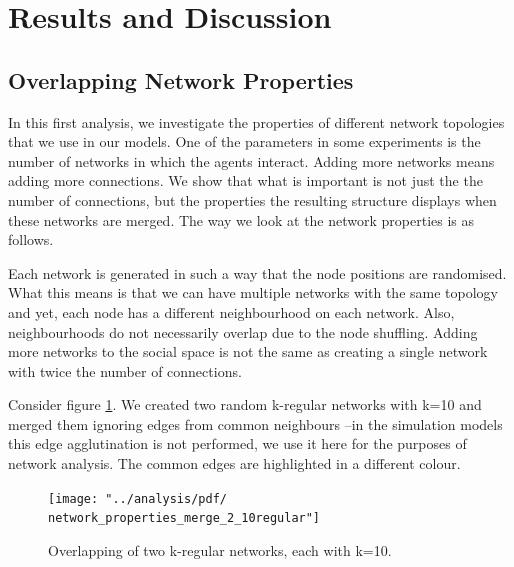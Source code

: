 \documentclass[preprint,number]{elsarticle}
\begin{document}
\section{Results and Discussion}
\label{sec:results-discussion}


\subsection{Overlapping Network Properties}
\label{sec:network_properties}
In this first analysis, we investigate the properties of different network topologies that we use in our models. 
One of the parameters in some experiments is the number of networks in which the agents interact. Adding more networks means adding more connections. 
We show that what is important is not just the the number of connections, but the properties the resulting structure displays when these networks are merged. The way we look at the network properties is as follows.

Each network is generated in such a way that the node positions are randomised. What this means is that we can have multiple networks with the same topology and yet, each node has a different neighbourhood on each network. Also, neighbourhoods do not necessarily overlap due to the node shuffling. Adding more networks to the social space is not the same as creating a single network with twice the number of connections. 

\noindent Consider figure \ref{fig:network_properties_merge_2_10regular}. We created two random k-regular networks with k=10 and merged them ignoring edges from common neighbours --in the simulation models this edge agglutination is not performed, we use it here for the purposes of network analysis. The common edges are highlighted in a different colour.

\begin{figure}
	\centering
	\texttt{[image: "../analysis/pdf/ network\_properties\_merge\_2\_10regular"]}
	\begin{minipage}{0.9\textwidth}
		\caption{Overlapping of two k-regular networks, each with k=10.}
		\label{fig:network_properties_merge_2_10regular}
	\end{minipage}
\end{figure}
\end{document}
